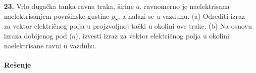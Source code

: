 \textbf{\Large 23.} Vrlo duga\v{c}ka tanka ravna traka, \v{s}irine $a$, ravnomerno je naelektrisana naelektrisanjem povr\v{s}inske gustine $\rho_{\mathrm S}$, a nalazi se u vazduhu. (a) Odrediti izraz za vektor elektri\v{c}nog polja u projzvoljnoj ta\v{c}ki u okolini ove trake. (b) Na osnovu izraza dobijenog pod (a), izvesti izraz za vektor elektri\v{c}nog polja u okolini naelektrisane ravni u vazduhu.
\\\\
\textbf{\Large Re\v{s}enje}\\
